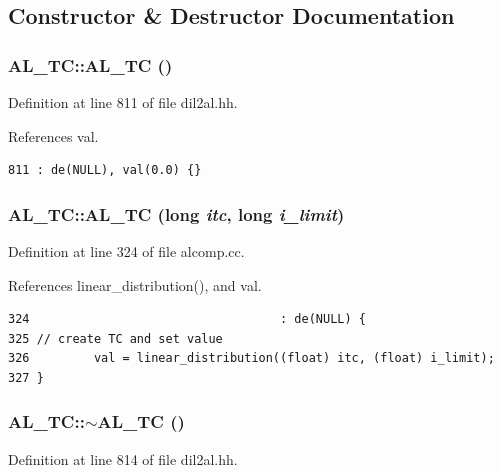 \subsection{Constructor \& Destructor Documentation}
\subsubsection{\setlength{\rightskip}{0pt plus 5cm}AL\_\-TC::AL\_\-TC ()\hspace{0.3cm}{\tt  [inline]}}\label{classAL__TC_a0}




Definition at line 811 of file dil2al.hh.

References val.



\footnotesize\begin{verbatim}811 : de(NULL), val(0.0) {}
\end{verbatim}\normalsize 
{}
\subsubsection{\setlength{\rightskip}{0pt plus 5cm}AL\_\-TC::AL\_\-TC (long {\em itc}, long {\em i\_\-limit})}\label{classAL__TC_a1}




Definition at line 324 of file alcomp.cc.

References linear\_\-distribution(), and val.



\footnotesize\begin{verbatim}324                                   : de(NULL) {
325 // create TC and set value
326         val = linear_distribution((float) itc, (float) i_limit);
327 }
\end{verbatim}\normalsize 
{}
\subsubsection{\setlength{\rightskip}{0pt plus 5cm}AL\_\-TC::$\sim$AL\_\-TC ()\hspace{0.3cm}{\tt  [inline]}}\label{classAL__TC_a2}




Definition at line 814 of file dil2al.hh.



